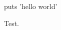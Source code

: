 \documentclass{article}
\begin{document}
\begin{inrbtex}
puts 'hello world'
\end{inrbtex}
Test.
\end{document}
